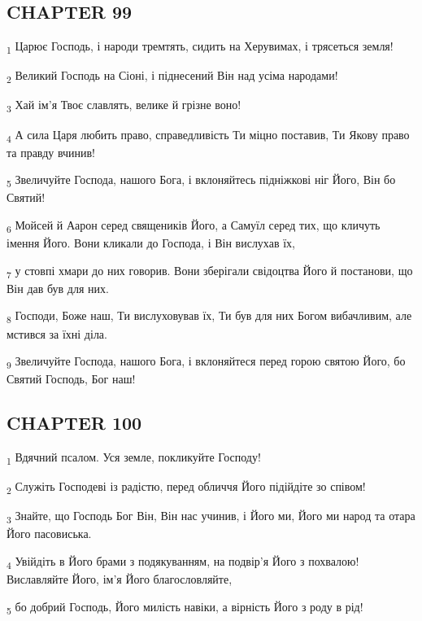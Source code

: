 \subsection{CHAPTER 99}
\begin{tcolorbox}
\textsubscript{1} Царює Господь, і народи тремтять, сидить на Херувимах, і трясеться земля!
\end{tcolorbox}
\begin{tcolorbox}
\textsubscript{2} Великий Господь на Сіоні, і піднесений Він над усіма народами!
\end{tcolorbox}
\begin{tcolorbox}
\textsubscript{3} Хай ім'я Твоє славлять, велике й грізне воно!
\end{tcolorbox}
\begin{tcolorbox}
\textsubscript{4} А сила Царя любить право, справедливість Ти міцно поставив, Ти Якову право та правду вчинив!
\end{tcolorbox}
\begin{tcolorbox}
\textsubscript{5} Звеличуйте Господа, нашого Бога, і вклоняйтесь підніжкові ніг Його, Він бо Святий!
\end{tcolorbox}
\begin{tcolorbox}
\textsubscript{6} Мойсей й Аарон серед священиків Його, а Самуїл серед тих, що кличуть імення Його. Вони кликали до Господа, і Він вислухав їх,
\end{tcolorbox}
\begin{tcolorbox}
\textsubscript{7} у стовпі хмари до них говорив. Вони зберігали свідоцтва Його й постанови, що Він дав був для них.
\end{tcolorbox}
\begin{tcolorbox}
\textsubscript{8} Господи, Боже наш, Ти вислуховував їх, Ти був для них Богом вибачливим, але мстився за їхні діла.
\end{tcolorbox}
\begin{tcolorbox}
\textsubscript{9} Звеличуйте Господа, нашого Бога, і вклоняйтеся перед горою святою Його, бо Святий Господь, Бог наш!
\end{tcolorbox}
\subsection{CHAPTER 100}
\begin{tcolorbox}
\textsubscript{1} Вдячний псалом. Уся земле, покликуйте Господу!
\end{tcolorbox}
\begin{tcolorbox}
\textsubscript{2} Служіть Господеві із радістю, перед обличчя Його підійдіте зо співом!
\end{tcolorbox}
\begin{tcolorbox}
\textsubscript{3} Знайте, що Господь Бог Він, Він нас учинив, і Його ми, Його ми народ та отара Його пасовиська.
\end{tcolorbox}
\begin{tcolorbox}
\textsubscript{4} Увійдіть в Його брами з подякуванням, на подвір'я Його з похвалою! Виславляйте Його, ім'я Його благословляйте,
\end{tcolorbox}
\begin{tcolorbox}
\textsubscript{5} бо добрий Господь, Його милість навіки, а вірність Його з роду в рід!
\end{tcolorbox}
